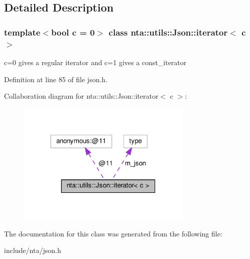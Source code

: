 \subsection{Detailed Description}
\subsubsection*{template$<$bool c = 0$>$\newline
class nta\+::utils\+::\+Json\+::iterator$<$ c $>$}

c=0 gives a regular iterator and c=1 gives a const\+\_\+iterator 

Definition at line 85 of file json.\+h.



Collaboration diagram for nta\+:\+:utils\+:\+:Json\+:\+:iterator$<$ c $>$\+:
\nopagebreak
\begin{figure}[H]
\begin{center}
\leavevmode
\includegraphics[width=236pt]{da/dc2/classnta_1_1utils_1_1Json_1_1iterator__coll__graph}
\end{center}
\end{figure}


The documentation for this class was generated from the following file\+:\begin{DoxyCompactItemize}
\item 
include/nta/json.\+h\end{DoxyCompactItemize}
